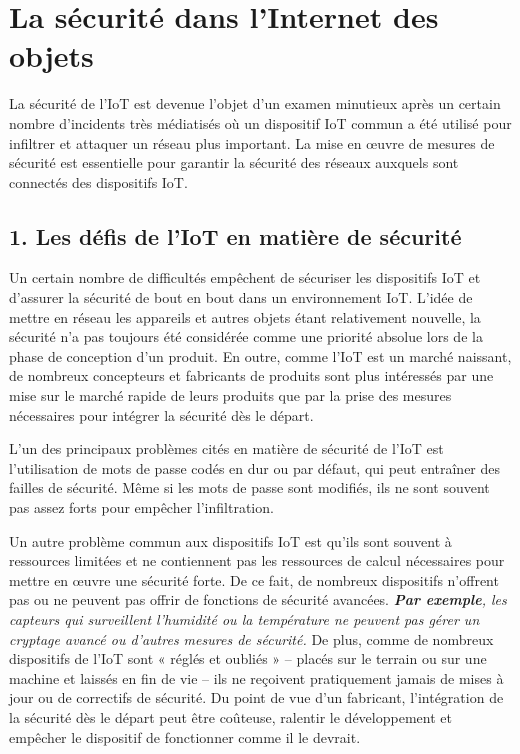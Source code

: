 \section{La sécurité dans l'Internet des objets}

La sécurité de l’IoT est devenue l’objet d’un examen minutieux après un certain nombre d’incidents très médiatisés où un dispositif IoT commun a été utilisé pour infiltrer et attaquer un réseau plus important. La mise en œuvre de mesures de sécurité est essentielle pour garantir la sécurité des réseaux auxquels sont connectés des dispositifs IoT.

\subsection*{1. Les défis de l’IoT en matière de sécurité}
Un certain nombre de difficultés empêchent de sécuriser les dispositifs IoT et d’assurer la sécurité de bout en bout dans un environnement IoT. L’idée de mettre en réseau les appareils et autres objets étant relativement nouvelle, la sécurité n’a pas toujours été considérée comme une priorité absolue lors de la phase de conception d’un produit. En outre, comme l’IoT est un marché naissant, de nombreux concepteurs et fabricants de produits sont plus intéressés par une mise sur le marché rapide de leurs produits que par la prise des mesures nécessaires pour intégrer la sécurité dès le départ.

L’un des principaux problèmes cités en matière de sécurité de l’IoT est l’utilisation de mots de passe codés en dur ou par défaut, qui peut entraîner des failles de sécurité. Même si les mots de passe sont modifiés, ils ne sont souvent pas assez forts pour empêcher l’infiltration.

Un autre problème commun aux dispositifs IoT est qu’ils sont souvent à ressources limitées et ne contiennent pas les ressources de calcul nécessaires pour mettre en œuvre une sécurité forte. De ce fait, de nombreux dispositifs n’offrent pas ou ne peuvent pas offrir de fonctions de sécurité avancées. \textit{\textbf{Par exemple}, les capteurs qui surveillent l’humidité ou la température ne peuvent pas gérer un cryptage avancé ou d’autres mesures de sécurité.} De plus, comme de nombreux dispositifs de l’IoT sont « réglés et oubliés » – placés sur le terrain ou sur une machine et laissés en fin de vie – ils ne reçoivent pratiquement jamais de mises à jour ou de correctifs de sécurité. Du point de vue d’un fabricant, l’intégration de la sécurité dès le départ peut être coûteuse, ralentir le développement et empêcher le dispositif de fonctionner comme il le devrait.

